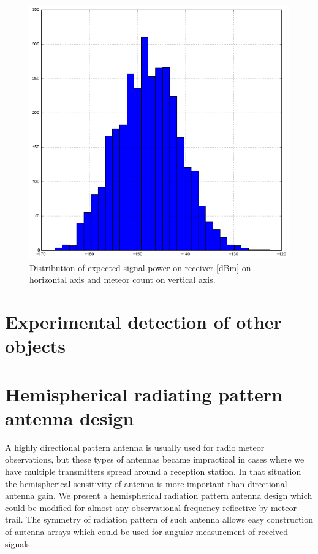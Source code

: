 \documentclass[twoside]{ctuthesis}
\theoremstyle{plain}
\theoremstyle{definition}
\theoremstyle{note}
\begin{document}
\begin{figure}
\includegraphics[width=\textwidth]{./img/Meteor_signal_intensity.png}
\caption{Distribution of expected signal power on receiver [dBm] on horizontal axis and meteor count on vertical axis.}
\label{VOR_meteors_intensity}
\end{figure}

\section{Experimental detection of other objects}

\section{Hemispherical radiating pattern antenna design}

A highly directional pattern antenna is usually used for radio meteor observations, but these types of antennas became impractical in cases where we have multiple transmitters spread around a reception station. In that situation the hemispherical sensitivity of  antenna is more important than directional antenna gain. We present a hemispherical radiation pattern antenna design which could be modified for almost any observational frequency reflective by meteor trail. The symmetry of radiation pattern of such antenna allows easy construction of antenna arrays which could be used for angular measurement of received signals.
\end{document}
